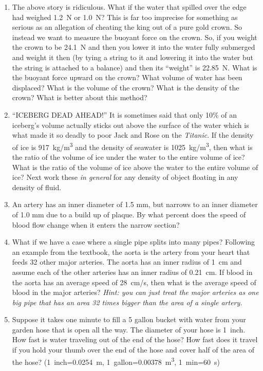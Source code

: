 \begin{enumerate}
	\item
	The above story is ridiculous. What if the water that spilled over the edge had weighed \SI{1.2}{\newton} or \SI{1.0}{\newton}? This is far too imprecise for something as serious as an allegation of cheating the king out of a pure gold crown. So instead we want to measure the buoyant force on the crown. So, if you weight the crown to be \SI{24.1}{\newton} and then you lower it into the water fully submerged and weight it then (by tying a string to it and lowering it into the water but the string is attached to a balance) and then its ``weight'' is \SI{22.85}{\newton}. What is the buoyant force upward on the crown? What volume of water has been displaced? What is the volume of the crown? What is the density of the crown? What is better about this method?
	\bigskip
	
	\item
	``ICEBERG DEAD AHEAD!'' It is sometimes said that only 10\% of an iceberg's volume actually sticks out above the surface of the water which is what made it so deadly to poor Jack and Rose on the \emph{Titanic}. If the density of ice is \SI{917}{\kg/m^3} and the density of seawater is \SI{1025}{kg/m^3}, then what is the ratio of the volume of ice under the water to the entire volume of ice? What is the ratio of the volume of ice above the water to the entire volume of ice?  Next work these \emph{in general} for any density of object floating in any density of fluid. 
	
	\item
	An artery has an inner diameter of 1.5 mm, but narrows to an inner diameter of 1.0 mm due to a build up of plaque. By what percent does the speed of blood flow change when it enters the narrow section?
	
	\item 
	What if we have a case where a single pipe splits into many pipes? Following an example from the textbook, the aorta is the artery from your heart that feeds 32 other major arteries. The aorta has an inner radius of \SI{1}{cm} and assume each of the other arteries has an inner radius of \SI{0.21}{cm}. If blood in the aorta has an average speed of \SI{28}{cm/s}, then what is the average speed of blood in the major arteries? \emph{Hint: you can just treat the major arteries as one big pipe that has an area 32 times bigger than the area of a single artery.}
	
	\item
	Suppose it takes one minute to fill a 5 gallon bucket with water from your garden hose that is open all the way. The diameter of your hose is \SI{1}{inch}. How fast is water traveling out of the end of the hose? How fast does it travel if you hold your thumb over the end of the hose and cover half of the area of the hose? (\SI{1}{inch}=\SI{0.0254}{m}, \SI{1}{gallon}=\SI{0.00378}{m^3}, \SI{1}{min}=\SI{60}{s})
	

\end{enumerate}

